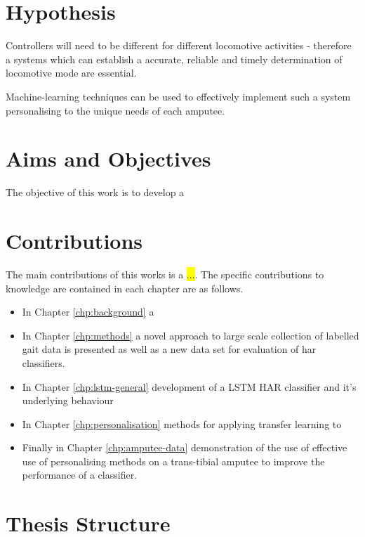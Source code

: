 \section{Hypothesis}
Controllers will need to be different for different locomotive activities - therefore a systems which can establish a accurate, reliable and timely determination of locomotive mode are essential.

Machine-learning techniques can be used to effectively implement such a system personalising to the unique needs of each amputee.


\section{Aims and Objectives}
The objective of this work is to develop a


\section{Contributions}
The main contributions of this works is a \hl{...}. The specific contributions to knowledge are
contained in each chapter are as follows.

\begin{itemize}
    \item In Chapter \ref{chp:background} a
    
    \item In Chapter \ref{chp:methods} a novel approach to large scale collection of labelled gait data is presented as well as a new data set for evaluation of \acrshort{har} classifiers.
    
    \item In Chapter \ref{chp:lstm-general} development of a LSTM HAR classifier and it's underlying behaviour
    
    \item In Chapter \ref{chp:personalisation} methods for applying transfer learning to 
    
    \item Finally in Chapter \ref{chp:amputee-data} demonstration of the use of effective use of personalising methods on a trans-tibial amputee to improve the performance of a classifier.
\end{itemize}

\section{Thesis Structure}
